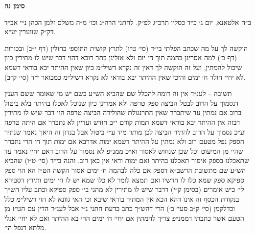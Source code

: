 \documentclass[12pt, openany]{book}
\newcommand{\chapname}{}
\newcommand{\newchap}[1]{
	\addcontentsline{toc}{chapter}{#1}
	\renewcommand{\chapname}{#1}
		\begin{center}
			\textbf{%
\fontsize{16pt}{16pt}\selectfont
				#1}
		\end{center}
}
\begin{document}
\begin{multicols}{2}
\end{multicols}\newpage

\newchap{סימן נח}
\begin{multicols}{2}
ב״ה אלטאנא, יום ג׳ כ״ד כסליו תרכ״ג לפ״ק. לחתני הרה״ג וכו׳ מ״ה משלם זלמן הכהן נ״י אב״ד דק״ק שווערין יע״א.\\\vspace{0pt}

הוקשה לך על מה שכתב הפלתי בי״ד (סי׳ ט״ו) לתרץ קושית התוספ׳ בחולין (דף י״ב) ובכורות (דף כ׳) למה אסרינן בהמה תוך ח׳ יום ולא אזלינן בתר רובא דהוי דבר שיש לו מתירין כיון שיכול להמתין, ועל זה הוקשה לך דאין זה נקרא דשיל״מ כיון שאין ההיתר יבא בודאי דשמא לא יחי׳ הולד ח׳ ימים והיכי שאין ההיתר יבא בודאי לא נקרא דשיל״מ כמבואר י״ד (סי׳ ק״ב).\\\vspace{0pt}

תשובה – לענ״ד אין זה דומה להכלל שם שהביא הש״ע בשם יש מי שאומר ששם הענין דנסמוך על הרוב לבטל הביצה ספק טרפה ולא אמרינן כיון שנוכל לאכלו בהיתר בלא ביטול ברוב אם נמתין עד שיתברר שאין התרנגולת שהולידה הביצה טרפה הוי דבר שיש לו מתירין דבזה אין ההיתר יבא בודאי דשמא תמות קודם י״ב חודש ועדיין לא נתברר אם היתה טרפה וע״כ נסמוך על הרוב להתיר הביצה לכן מותר מיד ע״י ביטול אבל בנדון זה היאך נאמר שנתיר הספק נפל מטעם רוב ולא נמתין על ההיתר דשמא ימות אדרבא אם ימות תוך ח׳ הרי נתברר שהי׳ מן המיעוט וכל שכן שנחוש לאסור וא״כ ממנ״פ לא נסמוך על הרוב דאם יחי׳ נאמר עד שתאכלנו בספק איסור תאכלנו בהיתר ואם ימות ודאי אין כאן רוב. והנה בי״ד (סי׳ ט״ו) שהביא הש״ע שם מתשובת הרשב״א דספק אם כלה לבהמה ח׳ ימים אסור הקשה הט״ז הא הוי ספק ספיקא ספק שמא כלו לו חדשיו ואם תמצא לומר לא כלו שמא יש לו ח׳ ימים ותירץ דסבירא לי׳ כיש אומרים (בסימן ק״י) דדבר שיש לו מתירין לא מהני בי׳ ספק ספיקא וכתב עליו הש״ך בנקודת הכסף זה אינו דהא הכא אין המתיר בודאי שיבא וכי האי גוונא לא הוי דשיל״מ כלל וכדלקמן (סי׳ ק״ב סעי׳ ב׳) הרי דהש״ך כתב כדעת חתני נ״י אבל לענ״ד הדין עם הט״ז מן הטעם אשר כתבתי דממנ״פ צריך להמתין אם יחי׳ ח׳ ימים הרי בא ההיתר ואם לא יחי׳ אגלי מלתא דנפל הי׳.\\\vspace{0pt}


\end{multicols}
\end{document}
